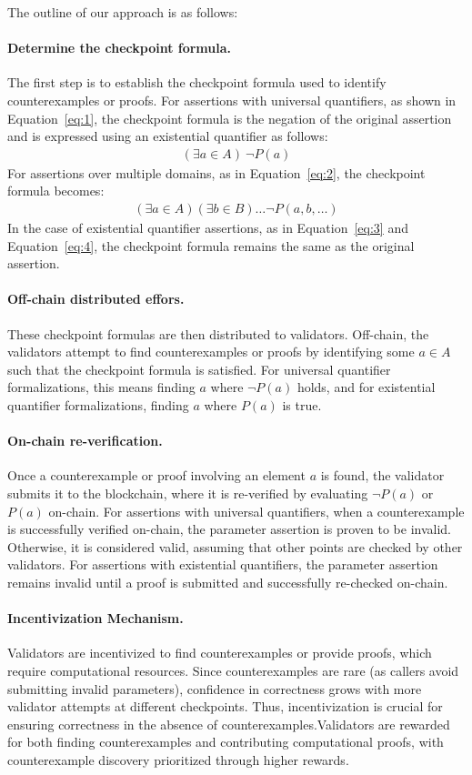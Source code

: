 \documentclass[runningheads]{llncs}
\begin{document}
The outline of our approach is as follows:
\paragraph{\textbf{Determine the checkpoint formula.}}
The first step is to establish the checkpoint formula used to identify counterexamples or proofs. For assertions with universal quantifiers, as shown in Equation~\ref{eq:1}, the checkpoint formula is the negation of the original assertion and is expressed using an existential quantifier as follows: 
\begin{gather}
\label{eq:9}
(\exists a \in A) \ \neg P(a)
\end{gather}
For assertions over multiple domains, as in Equation~\ref{eq:2}, the checkpoint formula becomes:
\begin{gather}
\label{eq:10}
(\exists a \in A) (\exists b \in B) \dots  \neg P(a, b, \dots)
\end{gather}
In the case of existential quantifier assertions, as in Equation~\ref{eq:3} and Equation~\ref{eq:4}, the checkpoint formula remains the same as the original assertion.
\paragraph{\textbf{Off-chain distributed effors.}}These checkpoint formulas are then distributed to validators. Off-chain, the validators attempt to find counterexamples or proofs by identifying some \( a \in A \) such that the checkpoint formula is satisfied. For universal quantifier formalizations, this means finding \( a \) where \( \neg P(a) \) holds, and for existential quantifier formalizations, finding \( a \) where \( P(a) \) is true.
\paragraph{\textbf{On-chain re-verification.}} Once a counterexample or proof involving an element \( a \) is found, the validator submits it to the blockchain, where it is re-verified by evaluating \( \neg P(a) \) or \( P(a) \) on-chain. For assertions with universal quantifiers, when a counterexample is successfully verified on-chain, the parameter assertion is proven to be invalid. Otherwise, it is considered valid, assuming that other points are checked by other validators. For assertions with existential quantifiers, the parameter assertion remains invalid until a proof is submitted and successfully re-checked on-chain.
\paragraph{\textbf{Incentivization Mechanism.}} Validators are incentivized to find counterexamples or provide proofs, which require computational resources. Since counterexamples are rare (as callers avoid submitting invalid parameters), confidence in correctness grows with more validator attempts at different checkpoints. Thus, incentivization is crucial for ensuring correctness in the absence of counterexamples.Validators are rewarded for both finding counterexamples and contributing computational proofs, with  counterexample discovery prioritized through higher rewards. 
\end{document}
